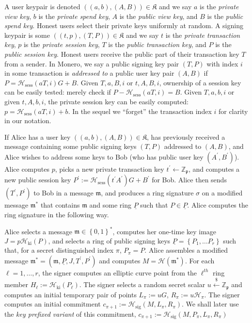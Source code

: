 \documentclass{iacrtrans}
\theoremstyle{definition}
\numberwithin{theorem}{subsection}
\numberwithin{lemma}{theorem}
\newcommand{\scalarField}{\mathbb{Z}_{\mathfrak{p}}}
\newcommand{\m}{\mathfrak{m}}
\begin{document}
A user keypair is denoted $((a,b),(A,B)) \in  \mathfrak{K}$ and we say $a$ is the \textit{private view key}, $b$ is the \textit{private spend key}, $A$ is the \textit{public view key}, and $B$ is the \textit{public spend key}. Honest users select their private keys uniformly at random. A signing keypair is some  $((t,p),(T,P)) \in \mathfrak{K}$ and we say $t$ is the \textit{private transaction key}, $p$ is the \textit{private session key}, $T$ is the \textit{public transaction key}, and $P$ is the \textit{public session key}. Honest users receive the public part of their transaction key $T$ from a sender. In Monero, we say a public signing key pair $(T,P)$ with index $i$ in some transaction is \textit{addressed to} a public user key pair $(A,B)$ if $P = \mathcal{H}_{\text{sess}}(aT, i)G + B$. Given $T, a, B, i$ or $t, A, B, i$, ownership of a session key can be easily tested: merely check if $P - \mathcal{H}_{\text{sess}}(aT, i) = B$. Given $T, a, b, i$ or given $t, A, b, i$, the private session key can be easily computed: $p = \mathcal{H}_{\text{sess}}(aT, i) + b$.  In the sequel we ``forget'' the transaction index $i$ for clarity in our notation.

If Alice has a user key $((a,b),(A,B)) \in  \mathfrak{K}$, has previously received a message containing some public signing keys $(T, P)$ addressed to $(A,B)$, and Alice wishes to address some keys to Bob (who has public user key $(A^{\prime}, B^{\prime})$). Alice computes $p$, picks a new private transaction key $t^{\prime} \leftarrow \scalarField$, and computes a new public session key $P^{\prime} := \mathcal{H}_{\text{sess}}(t^{\prime} A^{\prime})G + B^\prime$ for Bob. Alice then sends $(T^{\prime}, P^{\prime})$ to Bob in a message $\m$, and produces a ring signature $\sigma$ on a modified message $\m^*$ that contains $\m$ and some ring $\underline{P}$ such that $P \in \underline{P}$. Alice computes the ring signature in the following way.

Alice selects a message $\m \in \left\{0,1\right\}^*$, computes her one-time key image $J = p\mathcal{H}_{\text{ki}}(P)$, and selects a ring of public signing keys $\underline{P}=\left\{P_1, \ldots P_r\right\}$ such that, for a secret distinguished index $\pi$, $P_{\pi}=P$.  Alice assembles a modified message $\m^* = (\m, \underline{P}, J, T^{\prime}, P^{\prime})$ and computes $M = \mathcal{H}(\m^*)$. For each $\ell=1,\ldots,r$, the signer computes an elliptic curve point from the $\ell^{th}$ ring member $H_\ell := \mathcal{H}_{\text{ki}}(P_\ell)$. The signer selects a random secret scalar $u \overset{\$}{\leftarrow} \scalarField$ 
and computes an initial temporary pair of points $L_{\pi} := uG$,  $R_{\pi} := u\mathcal{H}_{\pi}$. The signer computes an initial commitment $c_{\pi+1} := \mathcal{H}_{\text{sig}}(M,L_{\pi}, R_{\pi})$. We shall later use the \textit{key prefixed variant} of this commitment, $c_{\pi+1} := \mathcal{H}_{\text{sig}}(M,P_\pi, L_{\pi}, R_{\pi})$
\end{document}
